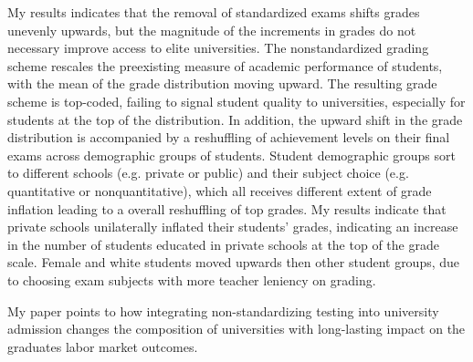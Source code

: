 My results indicates that the removal of standardized exams shifts grades unevenly upwards, but the magnitude of the increments in grades do not necessary improve access to elite universities. The nonstandardized grading scheme rescales the preexisting measure of academic performance of students, with the mean of the grade distribution moving upward. The resulting grade scheme is top-coded, failing to signal student quality to universities, especially for students at the top of the distribution. In addition, the upward shift in the grade distribution is accompanied by a reshuffling of achievement levels on their final exams across demographic groups of students. Student demographic groups sort to different schools (e.g. private or public) and their subject choice (e.g. quantitative or nonquantitative), which all receives different extent of grade inflation leading to a overall reshuffling of top grades. My results indicate that private schools unilaterally inflated their students' grades, indicating an increase in the number of students educated in private schools at the top of the grade scale. Female and white students moved upwards then other student groups, due to choosing exam subjects with more teacher leniency on grading. 

My paper points to how integrating non-standardizing testing into university admission changes the composition of universities with long-lasting impact on the graduates labor market outcomes.